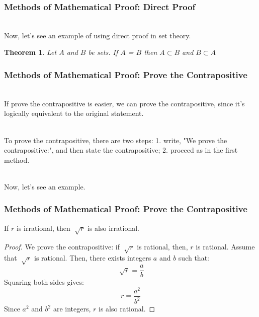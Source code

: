 \documentclass{beamer}
\newtheorem{thm}{Theorem}
\numberwithin{equation}{section}
\begin{document}
\begin{frame}
\frametitle{Methods of Mathematical Proof: Direct Proof}

\ \\Now, let's see an example of using direct proof in set theory. \pause

\begin{thm} Let $A$ and $B$ be sets.  If $A$ = $B$ then $A \subset B$ and $B \subset A$ \end{thm}
\pause
{}

\end{frame}



\begin{frame}
\frametitle{Methods of Mathematical Proof: Prove the Contrapositive}

\ \\If prove the contrapositive is easier, we can prove the contrapositive, since it's logically equivalent to the original statement. \pause

\ \\To prove the contrapositive, there are two steps: 1. write, "We prove the contrapositive:", and then state the contrapositive; 2. proceed as in the first method. \pause

\ \\Now, let's see an example.

\end{frame}



\begin{frame}
\frametitle{Methods of Mathematical Proof: Prove the Contrapositive}

\begin{theorem}
If $r$ is irrational, then $\sqrt[]{r}$ is also irrational.
\end{theorem}

\begin{proof}
We prove the contrapositive: if $\sqrt[]{r}$ is rational, then, $r$ is rational. \pause Assume that $\sqrt[]{r}$ is rational. Then, there exists integers $a$ and $b$ such that:
$$\sqrt[]{r} = \frac{a}{b}$$ \pause
Squaring both sides gives:
$$r = \frac{a^{2}}{b^{2}}$$ \pause
Since $a^{2}$ and $b^{2}$ are integers, $r$ is also rational.
\end{proof}

\end{frame}
\end{document}
